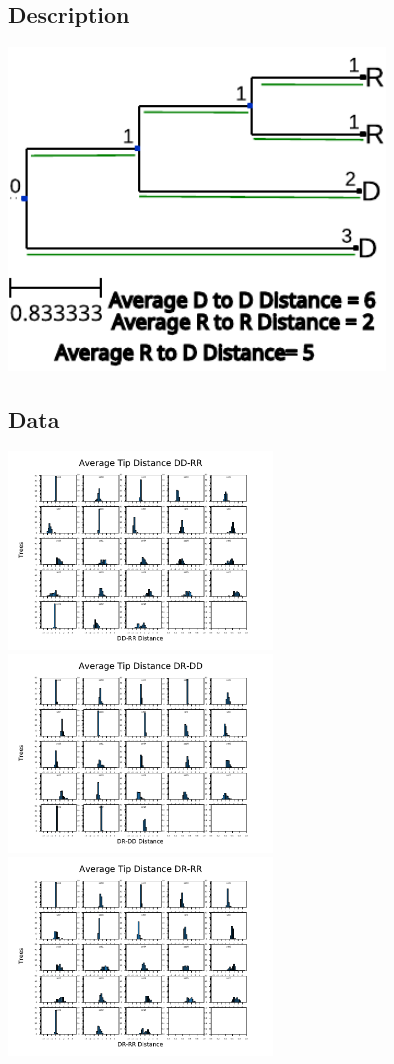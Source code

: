 \documentclass[
10pt,aspectratio=169,notheorems,hyperref={pdfauthor=whatever}
]{beamer}
\begin{document}
\subsection{Description}
\begin{frame}
  \centering
  \includegraphics[width=10cm, angle=0]{distexample}
 \end{frame}

\subsection{Data}
\begin{frame}
  \centering
  \includegraphics[width=7cm, angle=0]{dd_rr_distance}
  \includegraphics[width=7cm, angle=0]{dr_dd_distance}
  \includegraphics[width=7cm, angle=0]{dr_rr_distance}
\end{frame}
\end{document}
